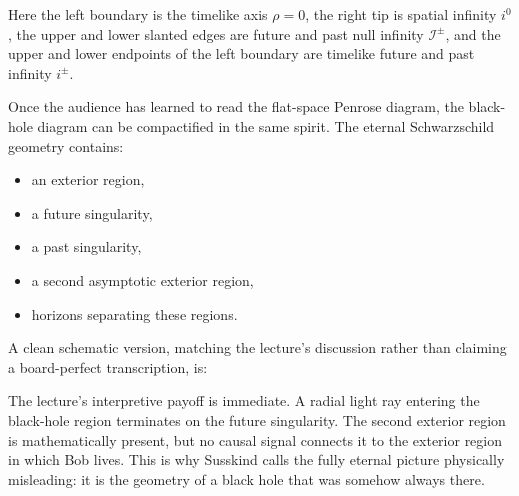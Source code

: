 Here the left boundary is the timelike axis \(\rho=0\), the right tip is spatial infinity \(i^0\), the upper and lower slanted edges are future and past null infinity \(\mathscr{I}^\pm\), and the upper and lower endpoints of the left boundary are timelike future and past infinity \(i^\pm\).

Once the audience has learned to read the flat-space Penrose diagram, the black-hole diagram can be compactified in the same spirit. The eternal Schwarzschild geometry contains:
\begin{itemize}
\item an exterior region,
\item a future singularity,
\item a past singularity,
\item a second asymptotic exterior region,
\item horizons separating these regions.
\end{itemize}
A clean schematic version, matching the lecture's discussion rather than claiming a board-perfect transcription, is:

\begin{figure}[h]
\centering
{}
\end{figure}

The lecture's interpretive payoff is immediate. A radial light ray entering the black-hole region terminates on the future singularity. The second exterior region is mathematically present, but no causal signal connects it to the exterior region in which Bob lives. This is why Susskind calls the fully eternal picture physically misleading: it is the geometry of a black hole that was somehow always there.

